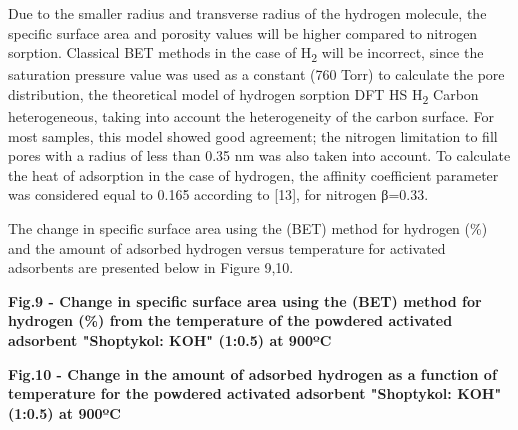 
\begin{multicols}{2}
Due to the smaller radius and transverse radius of the hydrogen
molecule, the specific surface area and porosity values
\hspace{0pt}\hspace{0pt}will be higher compared to nitrogen sorption.
Classical BET methods in the case of H\textsubscript{2} will be
incorrect, since the saturation pressure value was used as a constant
(760 Torr) to calculate the pore distribution, the theoretical model of
hydrogen sorption DFT HS H\textsubscript{2} Carbon heterogeneous, taking
into account the heterogeneity of the carbon surface. For most samples,
this model showed good agreement; the nitrogen limitation to fill pores
with a radius of less than 0.35 nm was also taken into account. To
calculate the heat of adsorption in the case of hydrogen, the affinity
coefficient parameter was considered equal to 0.165 according to
{[}13{]}, for nitrogen β=0.33.

The change in specific surface area using the (BET) method for hydrogen
(\%) and the amount of adsorbed hydrogen versus temperature for
activated adsorbents are presented below in Figure 9,10.
\end{multicols}

{\bfseries Fig.9 - Change in specific surface area using the (BET) method for hydrogen (\%) from the temperature of the powdered activated adsorbent "Shoptykol: KOH" (1:0.5) at 900ºC}

{\bfseries Fig.10 - Change in the amount of adsorbed hydrogen as a function of temperature for the powdered activated adsorbent "Shoptykol: KOH" (1:0.5) at 900ºC}

